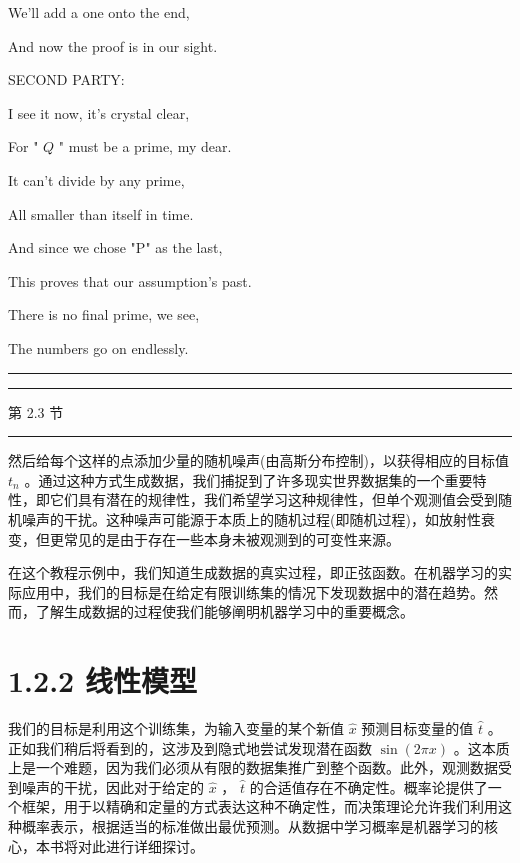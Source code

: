 \documentclass[10pt]{article}
\newcommand{\HRule}{\begin{center}\rule{0.9\linewidth}{0.2mm}\end{center}}
\begin{document}
\hspace*{1em} We'll add a one onto the end,

\hspace*{1em} And now the proof is in our sight.

\hspace*{1em} SECOND PARTY:

\hspace*{1em} I see it now, it's crystal clear,

\hspace*{1em} For " \(Q\) " must be a prime, my dear.

\hspace*{1em} It can't divide by any prime,

\hspace*{1em} All smaller than itself in time.

\hspace*{1em} And since we chose "P" as the last,

\hspace*{1em} This proves that our assumption's past.

\hspace*{1em} There is no final prime, we see,

\hspace*{1em} The numbers go on endlessly.

\HRule

\HRule

第 2.3 节

\HRule

然后给每个这样的点添加少量的随机噪声(由高斯分布控制)，以获得相应的目标值 \({t}_{n}\) 。通过这种方式生成数据，我们捕捉到了许多现实世界数据集的一个重要特性，即它们具有潜在的规律性，我们希望学习这种规律性，但单个观测值会受到随机噪声的干扰。这种噪声可能源于本质上的随机过程(即随机过程)，如放射性衰变，但更常见的是由于存在一些本身未被观测到的可变性来源。

在这个教程示例中，我们知道生成数据的真实过程，即正弦函数。在机器学习的实际应用中，我们的目标是在给定有限训练集的情况下发现数据中的潜在趋势。然而，了解生成数据的过程使我们能够阐明机器学习中的重要概念。

\section*{1.2.2 线性模型}

我们的目标是利用这个训练集，为输入变量的某个新值 \(\widehat{x}\) 预测目标变量的值 \(\widehat{t}\) 。正如我们稍后将看到的，这涉及到隐式地尝试发现潜在函数 \(\sin \left( {2\pi x}\right)\) 。这本质上是一个难题，因为我们必须从有限的数据集推广到整个函数。此外，观测数据受到噪声的干扰，因此对于给定的 \(\widehat{x}\) ， \(\widehat{t}\) 的合适值存在不确定性。概率论提供了一个框架，用于以精确和定量的方式表达这种不确定性，而决策理论允许我们利用这种概率表示，根据适当的标准做出最优预测。从数据中学习概率是机器学习的核心，本书将对此进行详细探讨。
\end{document}
